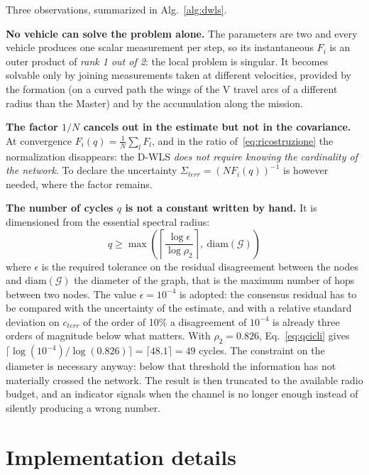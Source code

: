 \documentclass[conference,9pt]{IEEEtran}
\begin{document}
Three observations, summarized in Alg.~\ref{alg:dwls}.

\textbf{No vehicle can solve the problem alone.} The parameters are two and
every vehicle produces one scalar measurement per step, so its instantaneous
$F_i$ is an outer product of \emph{rank 1 out of 2}: the local problem is
singular. It becomes solvable only by joining measurements taken at different
velocities, provided by the formation (on a curved path the wings of the V
travel arcs of a different radius than the Master) and by the accumulation
along the mission.

\textbf{The factor $1/N$ cancels out in the estimate but not in the
covariance.} At convergence $F_i(q) = \frac{1}{N}\sum_l F_l$, and in the ratio
of~\eqref{eq:ricostruzione} the normalization disappears: the D-WLS \emph{does
not require knowing the cardinality of the network}. To declare the uncertainty
$\Sigma_{terr} = (N F_i(q))^{-1}$ is however needed, where the factor remains.

\textbf{The number of cycles $q$ is not a constant written by hand.} It is
dimensioned from the essential spectral radius:
\begin{equation}
q \geq \max\left(\left\lceil \frac{\log \epsilon}{\log \rho_2} \right\rceil,\
\mathrm{diam}(\mathcal{G})\right)
\label{eq:qcicli}
\end{equation}
where $\epsilon$ is the required tolerance on the residual disagreement between
the nodes and $\mathrm{diam}(\mathcal{G})$ the diameter of the graph, that is
the maximum number of hops between two nodes. The value $\epsilon = 10^{-4}$ is
adopted: the consensus residual has to be compared with the uncertainty of the
estimate, and with a relative standard deviation on $c_{terr}$ of the order of
10\% a disagreement of $10^{-4}$ is already three orders of magnitude below
what matters. With $\rho_2 = 0.826$, Eq.~\eqref{eq:qcicli} gives
$\lceil \log(10^{-4})/\log(0.826)\rceil = \lceil 48.1 \rceil = 49$ cycles.
The constraint on the diameter is necessary anyway: below that threshold the
information has not materially crossed the network. The result is then
truncated to the available radio budget, and an indicator signals when the
channel is no longer enough instead of silently producing a wrong number.

\section{Implementation details}
\label{sec:implementazione}
\end{document}
